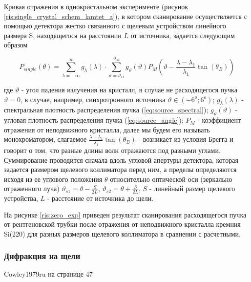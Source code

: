 Кривая отражения в однокристальном эксперименте (рисунок \ref{ris:single_crystal_schem_lamtet_a}), в котором сканирование осуществляется
 с помощью детектора жестко связанного с щелевым устройством линейного размера S, находящегося на расстоянии $L$ от источника, задается следующим образом

\begin{equation} \label{eq:p_single_crystal}
  P_{single}(\theta) = \sum_{\lambda = -\infty}^{\infty}g_{\lambda}(\lambda) \cdot \sum_{\vartheta = \vartheta_{s1}}^{\vartheta_{s2}}
  g_{\vartheta}(\vartheta) P_M(\vartheta - \frac{\lambda - \lambda_1}{\lambda_1}\tan(\theta_B))
 \end{equation}

где $\vartheta$ - угол падения излучения на кристалл, в случае не расходящегося пучка $\vartheta = 0$, в
случае, например, синхротронного источника $\vartheta \in (-6^o; 6^o) $; $g_{\lambda}(\lambda)$
- спектральная плотность распределения пучка (\ref{eq:source_spectral}); $g_{\vartheta}(\vartheta)$ - угловая плотность
распределения пучка (\ref{eq:source_angle}); $P_M$ - коэффициент отражения от неподвижного кристалла, далее мы будем его называть монохроматором,
слагаемое $\frac{\lambda - \lambda_1}{\lambda_1}\tan(\theta_B)$ -
возникает из условия Брегга и говорит о том, что разные длины волн отражаются под разными углами.
 Суммирование проводится сначала вдоль угловой апертуры детектора, которая задается размером
 щелевого коллиматора перед ним, а пределы определяются исходя из ее углового положения $\theta$ относительно
 оптической оси (зеркально отраженного луча) $\vartheta_{s1} = \theta - \frac{S}{2L}$, $\vartheta_{s2} = \theta + \frac{S}{2L}$,
 $S $ - линейный размер щелевого устройства, $L$ - расстояние от источника до щели.



На рисунке \ref{ris:zero_exp} приведен результат сканирования расходящегося пучка от рентгеновской
трубки после отражения от неподвижного кристалла кремния Si(220) для разных размеров щелевого коллиматора
в сравнении с расчетными.

   \subsubsection{Дифракция на щели}
      Cowley1979ru на странице 47
